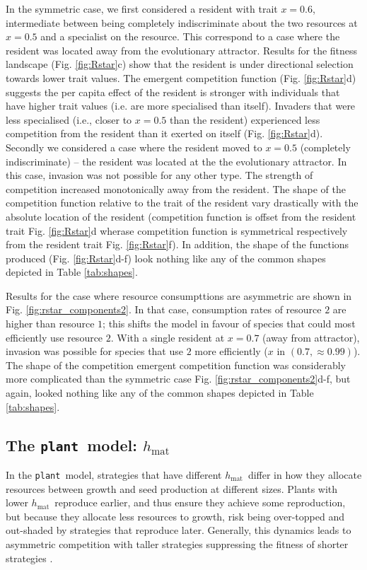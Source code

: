 \documentclass[a4paper,11pt]{article}
\newcommand{\plant}{{\tt plant}}
\newcommand{\hmat}{\ensuremath{h_{\text{mat}}}}
\begin{document}
In the symmetric case, we first considered a resident with trait $x =
0.6$, intermediate between being completely indiscriminate about the
two resources at $x = 0.5$ and a specialist on the resource. This
correspond to a case where the resident was located away from the
evolutionary attractor. Results for the fitness landscape
(Fig. \ref{fig:Rstar}c) show that the resident is under directional
selection towards lower trait values. The emergent competition
function (Fig. \ref{fig:Rstar}d) suggests the per capita effect of the
resident is stronger with individuals that have higher trait values
(i.e. are more specialised than itself). Invaders that were less
specialised (i.e., closer to $x = 0.5$ than the resident) experienced
less competition from the resident than it exerted on itself
(Fig. \ref{fig:Rstar}d). Secondly we considered a case where the
resident moved to $x = 0.5$ (completely indiscriminate) -- the
resident was located at the the evolutionary attractor.  In this case, invasion
was not possible for any other type. The strength of competition
increased monotonically away from the resident. The shape of the
competition function relative to the trait of the resident vary
drastically with the absolute location of the resident (competition
function is offset from the resident trait
Fig. \ref{fig:Rstar}d wherase competition function is symmetrical
respectively from the resident trait
Fig. \ref{fig:Rstar}f). In addition, the shape of the functions
produced (Fig. \ref{fig:Rstar}d-f) look nothing like any of the common shapes depicted in Table \ref{tab:shapes}.

Results for the case where resource consumpttions are asymmetric are
shown in Fig. \ref{fig:rstar_components2}. In that case, consumption
rates of resource $2$ are higher than resource $1$; this shifts the
model in favour of species that could most efficiently use resource
$2$. With a single resident at $x = 0.7$ (away from attractor),
invasion was possible for species that use $2$ more efficiently ($x$
in $(0.7, \approx 0.99)$). The shape of the competition emergent
competition function was considerably more complicated than the
symmetric case Fig. \ref{fig:rstar_components2}d-f, but again, looked
nothing like any of the common shapes depicted in Table
\ref{tab:shapes}. 

\subsection{The \plant\ model: \hmat}

In the \plant\ model, strategies that have different \hmat\ differ in how they allocate resources between growth and seed production at different sizes. Plants with lower \hmat\ reproduce earlier, and thus ensure they achieve some reproduction, but because they allocate less resources to growth, risk being over-topped and out-shaded by strategies that reproduce later. Generally, this dynamics leads to asymmetric competition with taller strategies suppressing the fitness of shorter strategies \cite{Falster-2017}.
\end{document}
